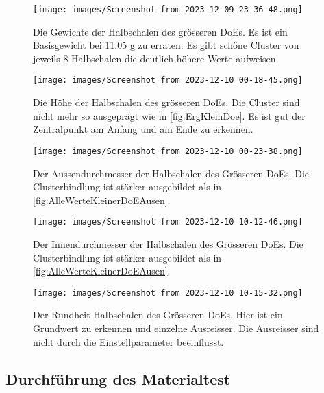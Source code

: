 \begin{figure}
   
  \texttt{[image: images/Screenshot from 2023-12-09 23-36-48.png]}
  \caption{Die Gewichte der Halbschalen des grösseren DoEs. Es ist ein Basisgewicht bei 11.05 g zu erraten. Es gibt schöne Cluster von jeweils 8 Halbschalen die deutlich höhere Werte aufweisen}
  \label{fig:GDoEGe}
\end{figure}



\begin{figure}
   
  \texttt{[image: images/Screenshot from 2023-12-10 00-18-45.png]}
  \caption{Die Höhe der Halbschalen des grösseren DoEs. Die Cluster sind nicht mehr so ausgeprägt wie in \ref{fig:ErgKleinDoe}. Es ist gut der Zentralpunkt am Anfang und am Ende zu erkennen.}
  \label{fig:GDoEH}
\end{figure}



\begin{figure}
   
  \texttt{[image: images/Screenshot from 2023-12-10 00-23-38.png]}
  \caption{Der Aussendurchmesser der Halbschalen des Grösseren DoEs. Die Clusterbindlung ist stärker ausgebildet als in \ref{fig:AlleWerteKleinerDoEAusen}.
}
  \label{fig:GDoED}
\end{figure}


\begin{figure}
   
  \texttt{[image: images/Screenshot from 2023-12-10 10-12-46.png]}
  \caption{Der Innendurchmesser der Halbschalen des Grösseren DoEs. Die Clusterbindlung ist stärker ausgebildet als in \ref{fig:AlleWerteKleinerDoEAusen}.
}
  \label{fig:GDoEI}
\end{figure}




\begin{figure}
   
  \texttt{[image: images/Screenshot from 2023-12-10 10-15-32.png]}
  \caption{Der Rundheit Halbschalen des Grösseren DoEs. Hier ist ein Grundwert zu erkennen und einzelne Ausreisser. Die Ausreisser sind nicht durch die Einstellparameter beeinflusst.}
  \label{fig:GDoER}
\end{figure}


\subsection{Durchführung des Materialtest}

